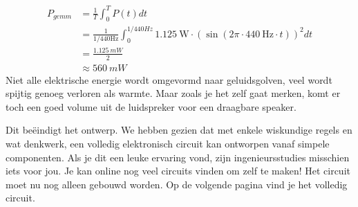 \documentclass{article}
\begin{document}
			\begin{align}
			P_{gemm} &= \frac{1}{T} \int_0^T P(t) dt \\ 
			& = \frac{1}{1/440 \text{Hz}} \int_0^{1/440Hz} 1.125~\text{W} \cdot \left( \sin \left(2\pi \cdot 440~\text{Hz} \cdot t\right) \right)^2 dt \\&= \frac{1.125~mW}{2} \\ 
			& \approx 560~mW
			\end{align}
			Niet alle elektrische energie  wordt omgevormd naar geluidsgolven, veel wordt spijtig genoeg verloren als warmte. Maar zoals je het zelf gaat merken, komt er toch een goed volume uit de luidspreker voor een draagbare speaker.

			Dit be\"eindigt het ontwerp. We hebben gezien dat met enkele wiskundige regels en wat denkwerk, een volledig elektronisch circuit kan ontworpen vanaf simpele componenten. Als je dit een leuke ervaring vond, zijn ingenieursstudies misschien iets voor jou. Je kan online nog veel circuits vinden om zelf te maken!
			Het circuit moet nu nog alleen gebouwd worden. Op de volgende pagina vind je het volledig circuit. 
\end{document}
